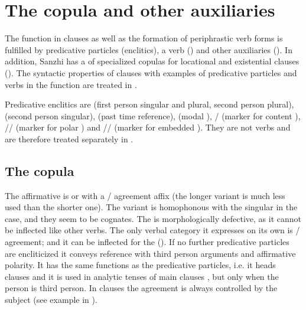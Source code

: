 \chapter{The copula and other auxiliaries}
\label{cpt:copulaotherauxiliaries}

The  function in  clauses as well as the formation of periphrastic verb forms is fulfilled by predicative particles (enclitics), a  verb () and other auxiliaries (). In addition, Sanzhi has a  of specialized copulas for locational and existential clauses (). The syntactic properties of  clauses with examples of predicative particles and verbs in the  function are treated in .

Predicative enclitics are  (first person singular and plural, second person plural),  (second person singular),  (past time reference),  (modal ), \slash{} (marker for content ), \slash{}\slash{} (marker for polar ) and \slash{}\slash{} (marker for embedded ). They are not verbs and are therefore treated separately in .



\section{The copula}
\label{sec:The copula}

The affirmative  is  or  with a / agreement affix (the longer variant is much less used than the shorter one). The variant  is homophonous with the singular  in the  case, and they seem to be cognates. The  is morphologically defective, as it cannot be inflected like other verbs. The only verbal category it expresses on its own is / agreement; and it can be inflected for the  (). If no further predicative particles are encliticized it conveys  reference with third person arguments and affirmative polarity. It has the same functions as the predicative particles, i.e. it heads  clauses  and it is used in analytic tenses of main clauses , but only when the person  is third person. In  clauses the agreement is always controlled by the subject (see example  in ).

